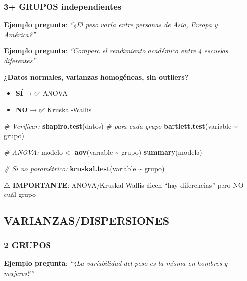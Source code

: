 \documentclass[
  10pt,
]{article}
\newenvironment{Shaded}{\begin{snugshade}}{\end{snugshade}}
\newcommand{\CommentTok}[1]{\textcolor[rgb]{0.56,0.35,0.01}{\textit{#1}}}
\newcommand{\FunctionTok}[1]{\textcolor[rgb]{0.13,0.29,0.53}{\textbf{#1}}}
\newcommand{\NormalTok}[1]{#1}
\newcommand{\OtherTok}[1]{\textcolor[rgb]{0.56,0.35,0.01}{#1}}
\newcommand{\SpecialCharTok}[1]{\textcolor[rgb]{0.81,0.36,0.00}{\textbf{#1}}}
\providecommand{\tightlist}{%
  \setlength{\itemsep}{0pt}\setlength{\parskip}{0pt}}
\begin{document}
\subsubsection{3+ GRUPOS independientes}\label{grupos-independientes}

\textbf{Ejemplo pregunta}: \emph{``¿El peso varía entre personas de
Asia, Europa y América?''}

\textbf{Ejemplo pregunta}: \emph{``Compara el rendimiento académico
entre 4 escuelas diferentes''}

\textbf{¿Datos normales, varianzas homogéneas, sin outliers?}

\begin{itemize}
\tightlist
\item
  \textbf{SÍ} → ✅ ANOVA
\item
  \textbf{NO} → ✅ Kruskal-Wallis
\end{itemize}

\begin{Shaded}
\begin{Highlighting}[]
\CommentTok{\# Verificar:}
\FunctionTok{shapiro.test}\NormalTok{(datos) }\CommentTok{\# para cada grupo}
\FunctionTok{bartlett.test}\NormalTok{(variable }\SpecialCharTok{\textasciitilde{}}\NormalTok{ grupo)}

\CommentTok{\# ANOVA:}
\NormalTok{modelo }\OtherTok{\textless{}{-}} \FunctionTok{aov}\NormalTok{(variable }\SpecialCharTok{\textasciitilde{}}\NormalTok{ grupo)}
\FunctionTok{summary}\NormalTok{(modelo)}

\CommentTok{\# Si no paramétrico:}
\FunctionTok{kruskal.test}\NormalTok{(variable }\SpecialCharTok{\textasciitilde{}}\NormalTok{ grupo)}
\end{Highlighting}
\end{Shaded}

⚠️ \textbf{IMPORTANTE}: ANOVA/Kruskal-Wallis dicen ``hay diferencias''
pero NO cuál grupo

\newpage

\subsection{VARIANZAS/DISPERSIONES}\label{varianzasdispersiones}

\subsubsection{2 GRUPOS}\label{grupos}

\textbf{Ejemplo pregunta}: \emph{``¿La variabilidad del peso es la misma
en hombres y mujeres?''}
\end{document}
